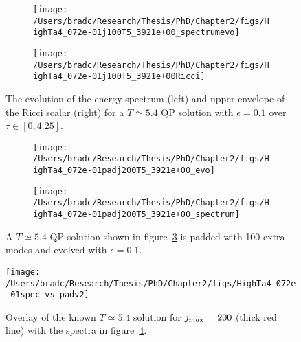 \documentclass[../PhD.tex]{subfiles}
\begin{document}
\begin{figure}[H]
	\begin{subfigure}[t]{0.48\textwidth}
		\texttt{[image: /Users/bradc/Research/Thesis/PhD/Chapter2/figs/HighTa4\_072e-01j100T5\_3921e+00\_spectrumevo]}
		\label{fig: HighTa4_072e-01j100T5_3921e+00_spectrumevo}
	\end{subfigure}
	\:
	\begin{subfigure}[t]{0.48\textwidth}
		\texttt{[image: /Users/bradc/Research/Thesis/PhD/Chapter2/figs/HighTa4\_072e-01j100T5\_3921e+00Ricci]}
		\label{fig: HighTa4_072e-01j100T5_3921e+00Ricci}
	\end{subfigure}
	\caption[Evolution of the energy spectrum and Ricci scalar for a $T \simeq 5.4$ QP solution]{The evolution of the energy spectrum (left) and upper envelope of the Ricci scalar (right) for a $T \simeq 5.4$ QP solution with $\epsilon = 0.1$ over $\tau \in [0, 4.25]$.}
	\label{fig:HighTa4_072e-01j100T5_3921e+00_evo}	
\end{figure}

\begin{figure}[h]
	\centering
	\begin{subfigure}[t]{0.45\textwidth}
		\texttt{[image: /Users/bradc/Research/Thesis/PhD/Chapter2/figs/HighTa4\_072e-01padj200T5\_3921e+00\_evo]}
	\end{subfigure}
	\;
	\begin{subfigure}[t]{0.45\textwidth}
		\texttt{[image: /Users/bradc/Research/Thesis/PhD/Chapter2/figs/HighTa4\_072e-01padj200T5\_3921e+00\_spectrum]}
	\end{subfigure}
	\caption[Evolution of the spectrum of a $T \simeq 5.4$ QP solution that has been padded with $100$ modes]{A $T \simeq 5.4$ QP solution shown in figure~\ref{fig:HighTa4_072e-01j100T5_3921e+00_evo} is padded with 100 extra modes and evolved with $\epsilon = 0.1$.}
	\label{fig: HighTa4_072e-01padj200T5_3921e+00_evo}
\end{figure}

\begin{figure}[ht]
	\centering
	\texttt{[image: /Users/bradc/Research/Thesis/PhD/Chapter2/figs/HighTa4\_072e-01spec\_vs\_padv2]}
	\caption[Comparison between a attracor solution with $j_{max} = 200$ and the evolution of a $j_{max} = 100$, $T \simeq 5.4$ solution that has been padded by $100$ modes]{Overlay of the known $T \simeq 5.4$ solution for $j_{max} = 200$ (thick red line) with the spectra in figure~\ref{fig: HighTa4_072e-01padj200T5_3921e+00_evo}.}
	\label{fig: HighTa4_072e-01spec_vs_pad}
\end{figure}
\end{document}
